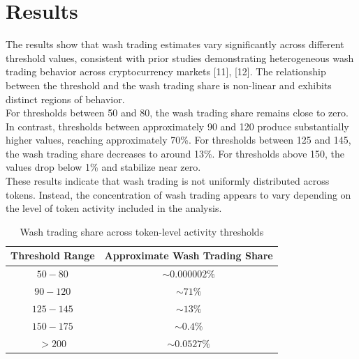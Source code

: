 \documentclass[language=english,thesis=bachelor,nosecondtitle,faculty=cb,onesided,12pt]{hsmw-thesis}
\begin{document}
	\section{Results}
The results show that wash trading estimates vary significantly across different threshold values, consistent with prior studies demonstrating heterogeneous wash trading behavior across cryptocurrency markets [11], [12]. The relationship between the threshold and the wash trading share is non-linear and exhibits distinct regions of behavior.\\
For thresholds between 50 and 80, the wash trading share remains close to zero. In contrast, thresholds between approximately 90 and 120 produce substantially higher values, reaching approximately 70\%. For thresholds between 125 and 145, the wash trading share decreases to around 13\%. For thresholds above 150, the values drop below 1\% and stabilize near zero.\\
These results indicate that wash trading is not uniformly distributed across tokens. Instead, the concentration of wash trading appears to vary depending on the level of token activity included in the analysis.
\begin{table}[h!]
\centering
\begin{tabular}{cc}
	\hline
	\textbf{Threshold Range} & \textbf{Approximate Wash Trading Share} \\ \hline
	$50-80$    & $\sim 0.000002\%$ \\ 
	$90-120$   & $\sim 71\%$       \\ 
	$125-145$  & $\sim 13\%$       \\ 
	$150-175$  & $\sim 0.4\%$      \\ 
	$>200$      & $\sim 0.0527\%$   \\ \hline
\end{tabular}
\caption{Wash trading share across token-level activity thresholds}
\label{table:wash_trading_shares}
\end{table}
\end{document}
